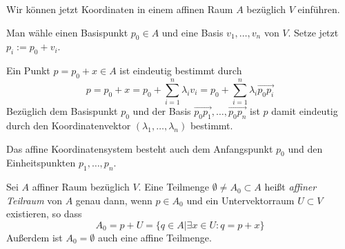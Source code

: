 \documentclass[a4paper, 10pt]{scrbook}
\begin{document}
Wir können jetzt Koordinaten in einem affinen Raum $A$ bezüglich $V$ einführen.

Man wähle einen Basispunkt $p_0\in A$ und eine Basis $v_1,\dotsc,v_n$ von $V$.
Setze jetzt $p_i := p_0 + v_i$.

Ein Punkt $p = p_0 +x\in A$ ist eindeutig bestimmt durch
\[
	p = p_0 + x = p_0 + \sum_{i=1}^n\lambda_i v_i = p_0 + \sum_{i=1}^n\lambda_i \vec{p_0p_i}
\]
Bezüglich dem Basispunkt $p_0$ und der Basis $\vec{p_0p_1},\dotsc,\vec{p_0p_n}$ ist $p$ damit eindeutig durch den Koordinatenvektor $(\lambda_1,\dotsc,\lambda_n)$ bestimmt.

Das affine Koordinatensystem besteht auch dem Anfangspunkt $p_0$ und den Einheitspunkten $p_1,\dotsc,p_n$.

\begin{df}
	\label{df: 8.5}
Sei $A$ affiner Raum bezüglich $V$. 
Eine Teilmenge $\emptyset \neq A_0 \subset A$ heißt \emph{affiner Teilraum} von $A$ genau dann, wenn $p \in A_0$ und ein Untervektorraum $U\subset V$ existieren, so dass 
\[
	A_0=p + U = \{q\in A\big| \exists x\in U: q=p+x\}
\]
Außerdem ist $A_0 = \emptyset$ auch eine affine Teilmenge.
\end{df}
\end{document}

